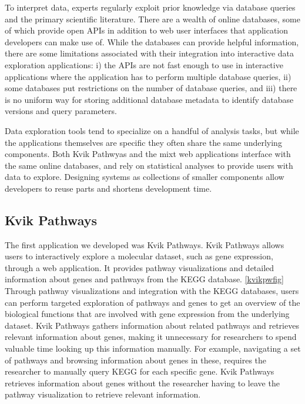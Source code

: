 To interpret data, experts regularly exploit prior knowledge via database
queries and the primary scientific literature. There are a wealth of online
databases, some of which provide open APIs in addition to web user interfaces
that application developers can make use of. While the databases can provide
helpful information, there are some limitations associated with their
integration into interactive data exploration applications: 
i) the APIs are not fast enough to use in interactive applications where the
application has to perform multiple database queries, 
ii) some databases put restrictions on the number of database queries, and 
iii) there is no uniform way for storing additional database metadata to
identify database versions and query parameters. 

Data exploration tools tend to specialize on a handful of analysis tasks, but
while the applications themselves are specific they often share the same
underlying components. Both Kvik Pathwyas and the \gls{mixt} web
applications interface with the same online databases, and rely on statistical
analyses to provide users with data to explore. Designing systems as collections
of smaller components allow developers to reuse parts and shortens development
time. 

\subsection{Kvik Pathways}
The first application we developed was Kvik Pathways. Kvik Pathways allows users
to interactively explore a molecular dataset, such as gene expression, through a
web application. It provides pathway visualizations and detailed information
about genes and pathways from the KEGG database. \ref{kvikpwfig} Through pathway
visualizations and integration with the KEGG databases, users can perform
targeted exploration of pathways and genes to get an overview of the biological
functions that are involved with gene expression from the underlying dataset.
Kvik Pathways gathers information about related pathways and retrieves relevant
information about genes, making it unnecessary for researchers to spend valuable
time looking up this information manually. For example, navigating a set of
pathways and browsing information about genes in these, requires the researcher
to manually query KEGG for each specific gene.  Kvik Pathways retrieves
information about genes without the researcher having to leave the pathway
visualization to retrieve relevant information. 

